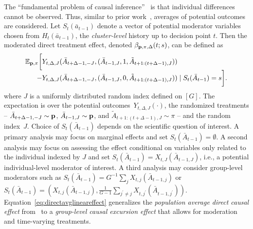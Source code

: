 \documentclass[lineno]{biometrika}
\begin{document}
The ``fundamental problem of causal inference''~\citep{Rubin, Pearl2009} is that individual differences cannot be observed. Thus, similar to prior work~\citep{DempseyAOAS, Boruvkaetal}, averages of potential outcomes are considered. Let $S_t (\bar a_{t-1})$ denote a vector of potential moderator variables chosen from $H_t (\bar a_{t-1})$, the \emph{cluster-level} history up to decision point $t$.  
Then the moderated direct treatment effect, denoted $\beta_{{\bf p}, \pi, \Delta} (t; s)$, can be defined as
\begin{equation}
\label{eq:directavglineareffect}
\begin{array}{r@{}l}
\mathbb{E}_{{\bf p}, \pi} \bigg[ &Y_{t,\Delta,J} (\bar A_{t+\Delta-1,-J}, (\bar A_{t-1,J}, 1, \tilde A_{t+1:(t+\Delta-1),J} )) \\
- &Y_{t,\Delta,J} (\bar A_{t+\Delta-1,-J}, (\bar A_{t-1,J}, 0,\tilde A_{t+1:(t+\Delta-1), J})) \mid  S_{t} (\bar A_{t-1}) = s \bigg].
\end{array}
\end{equation}
where $J$ is a uniformly distributed random index defined on $[G]$. The expectation is over the potential outcomes~$Y_{t,\Delta,J}(\cdot)$, the randomized treatments -- $\bar A_{t+\Delta-1,-J} \sim {\bf p}$, $\bar A_{t-1,J} \sim {\bf p}$, and $\tilde A_{t+1:(t+\Delta-1),J} \sim \pi$ -- and the random index~$J$.
Choice of $S_t (\bar A_{t-1})$ depends on the scientific question of interest.  A primary analysis may focus on marginal effects and set $S_t (\bar A_{t-1}) = \emptyset$.  A second analysis may focus on assessing the effect conditional on variables only related to the individual indexed by $J$ and set $S_t (\bar A_{t-1}) = X_{t,J} (\bar A_{t-1,J})$, i.e., a potential individual-level moderator of interest.  A third analysis may consider group-level moderators such as $S_t (\bar A_{t-1}) = G^{-1} \sum_j X_{t,j} (\bar A_{t-1,j})$ or $S_t (\bar A_{t-1}) = \left( X_{t,j}(\bar A_{t-1,j}), \frac{1}{G-1} \sum_{j^\prime \neq j} X_{t,j^\prime} (\bar A_{t-1,j^\prime}) \right)$. Equation~\eqref{eq:directavglineareffect} generalizes the \emph{population average direct causal effect} from~\cite{Tchetgen2012} to a \emph{group-level causal excursion effect} that allows for moderation and time-varying treatments. 
\end{document}
